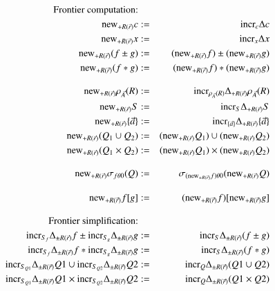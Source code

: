 \documentclass{article}
\begin{document}
%
%
\begin{figure*}
\begin{eqnarray}
\mbox{Frontier computation:} && \nonumber
\\
\label{eq:new1}
\algnew_{+R(\vec{r})} c       &:=& \algincr_{c} \Delta c \\
\label{eq:new2}
\algnew_{+R(\vec{r})} x       &:=& \algincr_{x} \Delta x \\
\label{eq:new3}
\algnew_{+R(\vec{r})} (f \pm g) &:=&
(\algnew_{+R(\vec{r})} f) \pm (\algnew_{+R(\vec{r})} g) \\
\label{eq:new4}
\algnew_{+R(\vec{r})} (f * g) &:=&
(\algnew_{+R(\vec{r})} f) * (\algnew_{+R(\vec{r})} g)
%
%
\nonumber
\\[2ex]
\label{eq:newr1}
\algnew_{+R(\vec{r})} \rho_{\vec{A}}(R) &:=&
   \algincr_{\rho_{\vec{A}}(R)} \Delta_{+R(\vec{r})} \rho_{\vec{A}}(R)
\\
\label{eq:newr2}
\algnew_{+R(\vec{r})} S &:=& \algincr_{S} \Delta_{+R(\vec{r})} S
\\
\label{eq:newr3}
\algnew_{+R(\vec{r})} \{ \vec{a} \} &:=&
\algincr_{\{ \vec{a} \}} \Delta_{+R(\vec{r})} \{ \vec{a} \}
\\
\label{eq:newr4}
\algnew_{+R(\vec{r})} (Q_1 \cup Q_2) &:=&
   (\algnew_{+R(\vec{r})} Q_1) \cup (\algnew_{+R(\vec{r})} Q_2)
\\
\label{eq:newr5}
\algnew_{+R(\vec{r})} (Q_1 \times Q_2) &:=&
   (\algnew_{+R(\vec{r})} Q_1) \times (\algnew_{+R(\vec{r})} Q_2)
%
%
\\[2ex]
\label{eq:newr6}
\algnew_{+R(\vec{r})} \sigma_{f \theta 0}(Q) &:=&
   \sigma_{(\algnew_{+R(\vec{r})} f) \theta 0}(\algnew_{+R(\vec{r})} Q)
%
%
\\[2ex]
\label{eq:newr7}
\algnew_{+R(\vec{r})} f[g] & := &
   (\algnew_{+R(\vec{r})} f)[\algnew_{+R(\vec{r})} g]
%
%
%
\\[2ex]
\mbox{Frontier simplification:} && \nonumber
\\
\label{eq:fs1}
\algincr_{S_f} \Delta_{\pm R(\vec{r})} f
    \pm \algincr_{S_g} \Delta_{\pm R(\vec{r})} g &:=&
\algincr_{S} \Delta_{\pm R(\vec{r})} (f \pm g)
\\
\label{eq:fs2}
\algincr_{S_f} \Delta_{\pm R(\vec{r})} f * \algincr_{S_g} \Delta_{\pm R(\vec{r})} g &:=&
\algincr_{S} \Delta_{\pm R(\vec{r})} (f * g)
\\
\label{eq:fs3}
\algincr_{S_{Q1}} \Delta_{\pm R(\vec{r})} Q1 \cup \algincr_{S_{Q2}} \Delta_{\pm R(\vec{r})} Q2
&:=&
\algincr_{Q} \Delta_{\pm R(\vec{r})} (Q1 \cup Q2)
\\
\label{eq:fs4}
\algincr_{S_{Q1}} \Delta_{\pm R(\vec{r})} Q1 \times \algincr_{S_{Q2}} \Delta_{\pm R(\vec{r})} Q2
&:=&
\algincr_{Q} \Delta_{\pm R(\vec{r})} (Q1 \times Q2)
\end{eqnarray}
\end{figure*}
\end{document}
